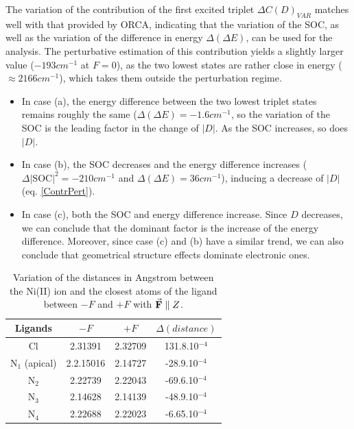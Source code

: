 \documentclass[12pt]{report}
\numberwithin{equation}{section}
\begin{document}
The variation of the contribution of the first excited triplet $\Delta C(D)_{VAR}$ matches well with that provided by ORCA, indicating that the variation of the SOC, as well as the variation of the difference in energy $\Delta (\Delta E)$, can be used for the analysis.
The perturbative estimation of this contribution yields a slightly larger value ($-193 cm^{-1}$ at $F=0$), as the two lowest states are rather close in energy ($\approx 2166 cm^{-1}$), which takes them outside the perturbation regime.
\begin{itemize}
\item In case (a), the energy difference between the two lowest triplet states remains roughly the same ($\Delta(\Delta E)=-1.6cm^{-1}$, so the variation of the SOC is the leading factor in the change of $|D|$. As the SOC increases, so does $|D|$.

\item In case (b), the SOC decreases and the energy difference increases ($\Delta|\text{SOC}|^2=-210cm^{-1}$ and $\Delta(\Delta E)=36cm^{-1}$), inducing a decrease of $|D|$ (eq. \ref{ContrPert}).

\item In case (c), both the SOC and energy difference increase. Since $D$ decreases, we can conclude that the dominant factor is the increase of the energy difference. Moreover, since case (c) and (b) have a similar trend, we can also conclude that geometrical structure effects dominate electronic ones.

\end{itemize}
\begin{table}[!ht]
    \centering
    \begin{tabular}{| c | c| c | c |}
        \hline
        Ligands & $-F$ & $+F$ &$\Delta(distance)$\\
        \hline
        Cl & 2.31391& 2.32709&  131.8.10$^{-4}$\\
        N$_1$ (apical) & 2.2.15016  & 2.14727 &-28.9.10$^{-4}$\\
        N$_2$ & 2.22739 & 2.22043&-69.6.10$^{-4}$ \\
        N$_3$ & 2.14628& 2.14139&-48.9.10$^{-4}$ \\
        N$_4$ & 2.22688 & 2.22023 &-6.65.10$^{-4}$\\
        \hline
    \end{tabular}
    \caption{Variation of the distances in Angstrom between the Ni(II) ion and the closest atoms of the ligand between $-F$ and $+F$ with $\vec{\vb{F}}\parallel Z$.}
    \label{tab:DistanceZ}
\end{table}
\end{document}
